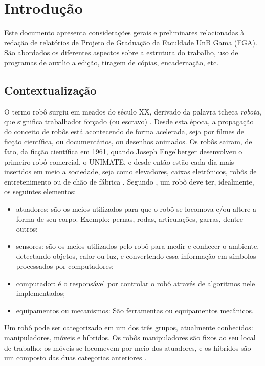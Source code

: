 \chapter{Introdução}

Este documento apresenta considerações gerais e preliminares relacionadas 
à redação de relatórios de Projeto de Graduação da Faculdade UnB Gama 
(FGA). São abordados os diferentes aspectos sobre a estrutura do trabalho, 
uso de programas de auxilio a edição, tiragem de cópias, encadernação, etc.

\section{Contextualização}

O termo robô surgiu em meados do século XX, derivado da palavra tcheca \textit{robota}, que significa trabalhador forçado (ou escravo) \cite{da2009roboeduc}. Desde esta época, a propagação do conceito de robôs está acontecendo de forma acelerada, seja por filmes de ficção científica, ou documentários, ou desenhos animados. 
Os robôs sairam, de fato, da ficção científica em 1961, quando Joseph Engelberger desenvolveu o primeiro robô comercial, o UNIMATE, e desde então estão cada dia mais inseridos em meio a sociedade, seja como elevadores, caixas eletrônicos, robôs de entretenimento ou de chão de fábrica . 
Segundo \cite{da2009roboeduc}, um robô deve ter, idealmente, os seguintes elementos:
\begin{itemize}
\item atuadores: são os meios utilizados para que o robô se locomova e/ou altere a forma de seu corpo. Exemplo: pernas, rodas, articulações, garras, dentre outros;
\item sensores: são os meios utilizados pelo robô para medir e conhecer o ambiente, detectando objetos, calor ou luz, e convertendo essa informação em símbolos processados por computadores;
\item computador: é o responsável por controlar o robô através de algoritmos nele implementados;
\item equipamentos ou mecanismos: São ferramentas ou equipamentos mecânicos.
\end{itemize}

Um robô pode ser categorizado em um dos três grupos, atualmente conhecidos: manipuladores, móveis e híbridos. Os robôs manipuladores são fixos ao seu local de trabalho; os móveis se locomevem por meio dos atuadores, e os híbridos são um composto das duas categorias anteriores  .

